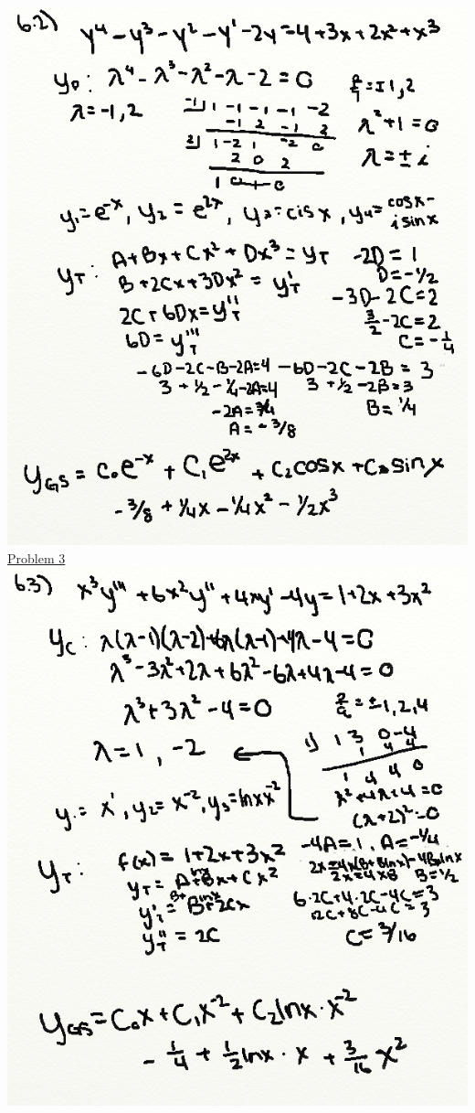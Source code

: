 \documentclass{article}
\begin{document}
\includegraphics[width=\textwidth,height=\textheight,keepaspectratio]{ams361p2.png}\clearpage{}
\underline{Problem 3}\newline{}
\includegraphics[width=\textwidth,height=\textheight,keepaspectratio]{ams361p3.png}\clearpage{}
\end{document}
